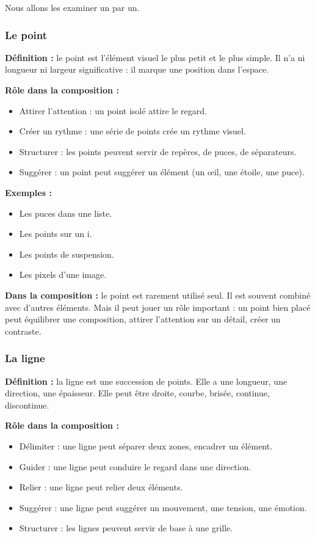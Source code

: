 Nous allons les examiner un par un.

\subsubsection{Le point}

\textbf{Définition :} le point est l'élément visuel le plus petit et le plus simple. Il n'a ni longueur ni largeur significative : il marque une position dans l'espace.

\textbf{Rôle dans la composition :}
\begin{itemize}
  \item Attirer l'attention : un point isolé attire le regard.
  \item Créer un rythme : une série de points crée un rythme visuel.
  \item Structurer : les points peuvent servir de repères, de puces, de séparateurs.
  \item Suggérer : un point peut suggérer un élément (un œil, une étoile, une puce).
\end{itemize}

\textbf{Exemples :}
\begin{itemize}
  \item Les puces dans une liste.
  \item Les points sur un i.
  \item Les points de suspension.
  \item Les pixels d'une image.
\end{itemize}

\textbf{Dans la composition :} le point est rarement utilisé seul. Il est souvent combiné avec d'autres éléments. Mais il peut jouer un rôle important : un point bien placé peut équilibrer une composition, attirer l'attention sur un détail, créer un contraste.

\subsubsection{La ligne}

\textbf{Définition :} la ligne est une succession de points. Elle a une longueur, une direction, une épaisseur. Elle peut être droite, courbe, brisée, continue, discontinue.

\textbf{Rôle dans la composition :}
\begin{itemize}
  \item Délimiter : une ligne peut séparer deux zones, encadrer un élément.
  \item Guider : une ligne peut conduire le regard dans une direction.
  \item Relier : une ligne peut relier deux éléments.
  \item Suggérer : une ligne peut suggérer un mouvement, une tension, une émotion.
  \item Structurer : les lignes peuvent servir de base à une grille.
\end{itemize}

